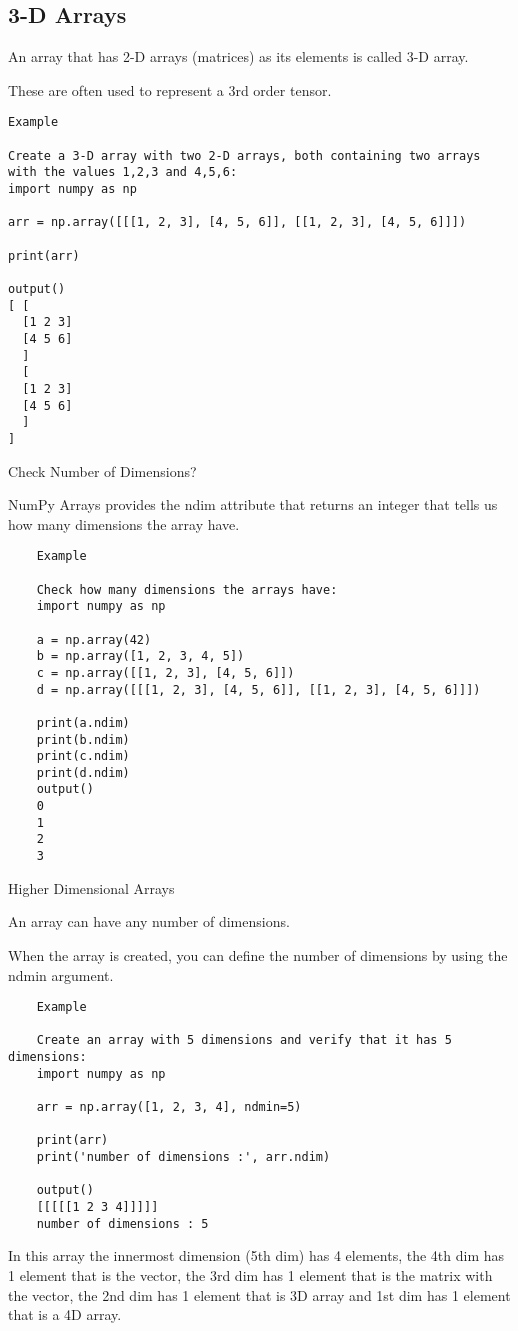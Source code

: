 \subsection{3-D Arrays}
An array that has 2-D arrays (matrices) as its elements is called 3-D array.

These are often used to represent a 3rd order tensor.

\begin{verbatim}
Example

Create a 3-D array with two 2-D arrays, both containing two arrays with the values 1,2,3 and 4,5,6:
import numpy as np

arr = np.array([[[1, 2, 3], [4, 5, 6]], [[1, 2, 3], [4, 5, 6]]])

print(arr) 

output()
[ [
  [1 2 3]
  [4 5 6]
  ]
  [
  [1 2 3]
  [4 5 6]
  ]
]
\end{verbatim}


Check Number of Dimensions?

NumPy Arrays provides the ndim attribute that returns an integer that tells us how many dimensions the array have.


\begin{verbatim}
	Example
	
	Check how many dimensions the arrays have:
	import numpy as np
	
	a = np.array(42)
	b = np.array([1, 2, 3, 4, 5])
	c = np.array([[1, 2, 3], [4, 5, 6]])
	d = np.array([[[1, 2, 3], [4, 5, 6]], [[1, 2, 3], [4, 5, 6]]])
	
	print(a.ndim)
	print(b.ndim)
	print(c.ndim)
	print(d.ndim) 
	output()
	0
	1
	2
	3
\end{verbatim}

Higher Dimensional Arrays

An array can have any number of dimensions.

When the array is created, you can define the number of dimensions by using the ndmin argument.

\begin{verbatim}
	Example
	
	Create an array with 5 dimensions and verify that it has 5 dimensions:
	import numpy as np
	
	arr = np.array([1, 2, 3, 4], ndmin=5)
	
	print(arr)
	print('number of dimensions :', arr.ndim) 
	
	output()
	[[[[[1 2 3 4]]]]]
	number of dimensions : 5
\end{verbatim}
In this array the innermost dimension (5th dim) has 4 elements, the 4th dim has 1 element that is the vector, the 3rd dim has 1 element that is the matrix with the vector, the 2nd dim has 1 element that is 3D array and 1st dim has 1 element that is a 4D array.

